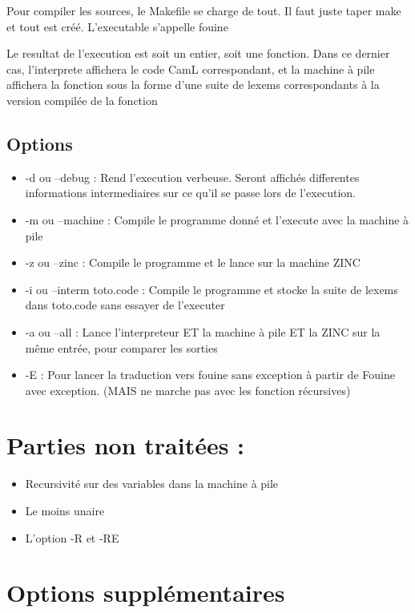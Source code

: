 Pour compiler les sources, le Makefile se charge de tout. Il faut juste
taper make et tout est créé. L'executable s'appelle fouine

Le resultat de l'execution est soit un entier, soit une fonction. Dans
ce dernier cas, l'interprete affichera le code CamL correspondant, et la
machine à pile affichera la fonction sous la forme d'une suite de lexems
correspondants à la version compilée de la fonction

\subsection{Options}\label{options}

\begin{itemize}
\tightlist
\item
  -d ou --debug : Rend l'execution verbeuse. Seront affichés differentes
  informations intermediaires sur ce qu'il se passe lors de l'execution.
\item
  -m ou --machine : Compile le programme donné et l'execute avec la
  machine à pile
\item
  -z ou --zinc : Compile le programme et le lance sur la machine ZINC
\item
  -i ou --interm toto.code : Compile le programme et stocke la suite de
  lexems dans toto.code sans essayer de l'executer
\item
  -a ou --all : Lance l'interpreteur ET la machine à pile ET la ZINC sur
  la même entrée, pour comparer les sorties
\item
  -E : Pour lancer la traduction vers fouine sans exception à partir de
  Fouine avec exception. (MAIS ne marche pas avec les fonction
  récursives)
\end{itemize}

\section{Parties non traitées :}\label{parties-non-traituxe9es}

\begin{itemize}
\tightlist
\item
  Recursivité sur des variables dans la machine à pile
\item
  Le moins unaire
\item
  L'option -R et -RE
\end{itemize}

\section{Options supplémentaires}\label{options-suppluxe9mentaires}

